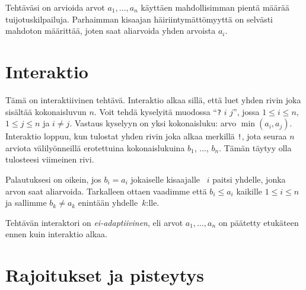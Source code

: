 Tehtäväsi on arvioida arvot $a_1,\ldots, a_n$ käyttäen mahdollisimman pientä 
määrää tuijotuskilpailuja.
Parhaimman kisaajan häiriintymättömyyttä on selvästi mahdoton määrittää, joten 
saat aliarvoida yhden arvoista $a_i$.

\section*{Interaktio}

Tämä on interaktiivinen tehtävä.
Interaktio alkaa sillä, että luet yhden rivin joka sisältää kokonaisluvun $n$.
Voit tehdä kyselyitä muodossa ``\texttt{?} $i$ $j$'', jossa 
$1\leq i\leq n$, $1\leq j\leq n$ ja $i\neq j$.
Vastaus kyselyyn on yksi kokonaisluku: arvo $\min(a_i, a_j)$.
Interaktio loppuu, kun tulostat yhden rivin joka alkaa merkillä \texttt{!}, 
jota seuraa $n$ arviota välilyönneillä erotettuina kokonaislukuina 
$b_1$, $\ldots$, $b_n$.
Tämän täytyy olla tulosteesi viimeinen rivi.

Palautuksesi on oikein, jos $b_i=a_i$ jokaiselle kisaajalle ~$i$ paitsi yhdelle,
jonka arvon saat aliarvoida.
Tarkalleen ottaen vaadimme että $b_i\leq a_i$ kaikille $1\leq i\leq n$  
ja sallimme $b_k \neq a_k$ enintään yhdelle~$k$:lle.

Tehtävän interaktori on \emph{ei-adaptiivinen}, eli arvot $a_1,\ldots, a_n$ 
on päätetty etukäteen ennen kuin interaktio alkaa.

\section*{Rajoitukset ja pisteytys}

